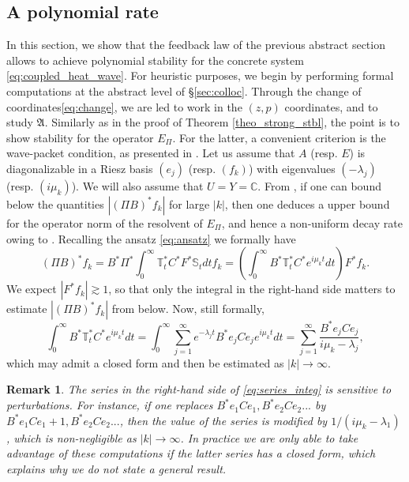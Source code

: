 \documentclass[10pt]{article}
\newtheorem{Remark}[Theorem]{Remark}
\begin{document}
\subsection{A polynomial rate}\label{ssub:pol}
In this section, we show that the feedback law of the previous abstract section allows to achieve polynomial stability for the concrete system \eqref{eq:coupled_heat_wave}. For heuristic purposes, we begin by performing formal computations at the abstract level of \S \ref{sec:colloc}. Through the change of coordinates\eqref{eq:change}, we are led to work in the $(z,p)$ coordinates, and to study $\mathfrak{A}$. Similarly as in the proof of Theorem \ref{theo_strong_stbl}, the point is to show stability for the operator $E_{\Pi}$. For the latter, a convenient criterion is the wave-packet condition, as presented in \cite[\S 3.A]{chill}. Let us assume that $A$ (resp. $E$) is diagonalizable in a Riesz basis $(e_j)$ (resp. $(f_k)$) with eigenvalues $(-\lambda_j)$ (resp. $(i\mu_k)$). We will also assume that $U = Y = \mathbb{C}$. From \cite[Theorem 3.5]{chill}, if one can bound below the quantities $|(\Pi B)^* f_k|$ for large $|k|$, then one deduces a upper bound for the operator norm of the resolvent of $E_{\Pi}$, and hence a non-uniform decay rate owing to \cite{borichev_tomilov}. Recalling the ansatz \eqref{eq:ansatz} we formally have
\[
(\Pi B)^* f_k = B^* \Pi^* \int_0^\infty \mathbb{T}_t^* C^* F^* \mathbb{S}_t dt f_k = \left (\int_0^\infty B^* \mathbb{T}_t^* C^* e^{i \mu_k t} dt \right ) F^*f_k. 
\]
We expect $|F^* f_k| \gtrsim 1$, so that only the integral in the right-hand side matters to estimate $|(\Pi B)^* f_k|$ from below. Now, still formally, 
\begin{equation}\label{eq:series_integ}
\int_0^\infty B^* \mathbb{T}_t^* C^* e^{i \mu_k t} dt = \int_0^\infty \sum_{j = 1}^\infty e^{-\lambda_j t} B^*e_j C e_j e^{i \mu_k t} dt = \sum_{j=1}^\infty \frac{B^*e_j C e_j}{i\mu_k - \lambda_j},
\end{equation}
which may admit a closed form and then be estimated as $|k| \to \infty$. 
\begin{Remark}
The series in the right-hand side of \eqref{eq:series_integ} is sensitive to perturbations. For instance, if one replaces $B^*e_1 C e_1,B^*e_2 C e_2...$ by $B^*e_1 C e_1+1,B^*e_2 C e_2...$, then the value of the series is modified by $1/(i\mu_k - \lambda_1)$, which is non-negligible as $|k| \to \infty$. In practice we are only able to take advantage of these computations if the latter series has a closed form, which explains why we do not state a general result. 
\end{Remark}
\end{document}
